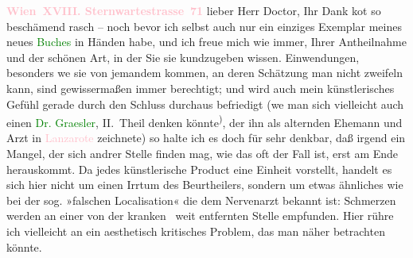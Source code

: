 \pstart
           \textcolor{gray}{\textbf{\textcolor{pink}{Wien XVIII. Sternwartestrasse 71}\ledrightnote{\textcolor{pink}{Sternwartestraße 71}}}}\pend
           \vspace{0.5em}
\pstart
           lieber Herr Doctor, Ihr Dank ko{\geminationm}t so beschämend rasch – noch bevor
               ich selbst auch nur ein einziges Exemplar meines neues \textcolor{green}{Buches}\ledrightnote{{$\rightarrow$}\emph{\textcolor{green}{Doktor Gräsler, Badearzt}}} in Händen habe, und ich freue mich wie immer, Ihrer
               Antheilnahme und der schönen Art, in der Sie sie kundzugeben wissen. Einwendungen,
               besonders we{\geminationn} sie von jemandem kommen, an deren Schätzung man nicht zweifeln kann,
               sind gewissermaßen immer berechtigt; und wird \introOben{}auch\introOben{} mein künstlerisches
               Gefühl gerade durch den Schluss durchaus befriedigt (we{\geminationn} man sich vielleicht auch
               einen \textcolor{green}{Dr. Graesler}\ledrightnote{\textcolor{green}{Doktor Gräsler, Badearzt}}, II. Theil denken könnte\substVorne{}\textsuperscript{)}\substDazwischen{},\substHinten{} der ihn als alternden Ehemann und Arzt in \textcolor{pink}{Lanzarote}\ledrightnote{\textcolor{pink}{Lanzarote}} zeichnete) {\pb}so halte
               ich es \introOben{}doch\introOben{} für sehr denkbar, daß irgend ein Mangel, der sich
                   andrer Stelle finden mag, wie das oft der Fall ist, erst
               am Ende herauskommt. Da jedes künstlerische Product eine Einheit vorstellt, handelt
               es sich hier nicht um einen Irrtum des Beurtheilers, sondern um etwas ähnliches wie
               bei der sog. »falschen Localisation« die dem Nervenarzt bekannt ist: Schmerzen werden
               an einer von der kranken  weit entfernten
               Stelle empfunden. Hier rühre ich vielleicht an ein aesthetisch kritisches Problem,
               das man näher betrachten könnte.\pend
           
